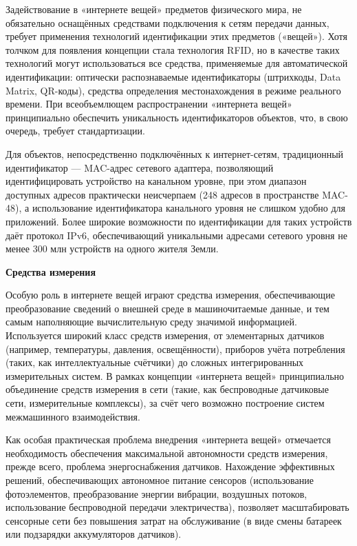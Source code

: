   Задействование в «интернете вещей» предметов физического мира, не обязательно оснащённых средствами подключения к сетям передачи данных, требует применения технологий идентификации этих предметов («вещей»). Хотя толчком для появления концепции стала технология RFID, но в качестве таких технологий могут использоваться все средства, применяемые для автоматической идентификации: оптически распознаваемые идентификаторы (штрихкоды, Data Matrix, QR-коды), средства определения местонахождения в режиме реального времени. При всеобъемлющем распространении «интернета вещей» принципиально обеспечить уникальность идентификаторов объектов, что, в свою очередь, требует стандартизации.

  Для объектов, непосредственно подключённых к интернет-сетям, традиционный идентификатор — MAC-адрес сетевого адаптера, позволяющий идентифицировать устройство на канальном уровне, при этом диапазон доступных адресов практически неисчерпаем (248 адресов в пространстве MAC-48), а использование идентификатора канального уровня не слишком удобно для приложений. Более широкие возможности по идентификации для таких устройств даёт протокол IPv6, обеспечивающий уникальными адресами сетевого уровня не менее 300 млн устройств на одного жителя Земли.

  \begin{center}{\bfseries Средства измерения}
  \end{center}

  Особую роль в интернете вещей играют средства измерения, обеспечивающие преобразование сведений о внешней среде в машиночитаемые данные, и тем самым наполняющие вычислительную среду значимой информацией. Используется широкий класс средств измерения, от элементарных датчиков (например, температуры, давления, освещённости), приборов учёта потребления (таких, как интеллектуальные счётчики) до сложных интегрированных измерительных систем. В рамках концепции «интернета вещей» принципиально объединение средств измерения в сети (такие, как беспроводные датчиковые сети, измерительные комплексы), за счёт чего возможно построение систем межмашинного взаимодействия.

  Как особая практическая проблема внедрения «интернета вещей» отмечается необходимость обеспечения максимальной автономности средств измерения, прежде всего, проблема энергоснабжения датчиков. Нахождение эффективных решений, обеспечивающих автономное питание сенсоров (использование фотоэлементов, преобразование энергии вибрации, воздушных потоков, использование беспроводной передачи электричества), позволяет масштабировать сенсорные сети без повышения затрат на обслуживание (в виде смены батареек или подзарядки аккумуляторов датчиков).

